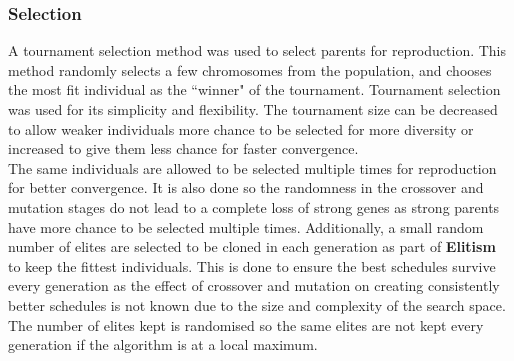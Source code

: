\documentclass{article}
\newcommand{\n}[0]{\\[\baselineskip]}
\begin{document}
\subsubsection{Selection}
A tournament selection method was used to select parents for reproduction. This method randomly selects a few chromosomes from the population, and chooses the most fit individual as the ``winner" of the tournament. Tournament selection was used for its simplicity and flexibility. The tournament size can be decreased to allow weaker individuals more chance to be selected for more diversity or increased to give them less chance for faster convergence. 
\n
The same individuals are allowed to be selected multiple times for reproduction for better convergence. It is also done so the randomness in the crossover and mutation stages do not lead to a complete loss of strong genes as strong parents have more chance to be selected multiple times. Additionally, a small random number of elites are selected to be cloned in each generation as part of \textbf{Elitism} to keep the fittest individuals. This is done to ensure the best schedules survive every generation as the effect of crossover and mutation on creating consistently better schedules is not known due to the size and complexity of the search space. The number of elites kept is randomised so the same elites are not kept every generation if the algorithm is at a local maximum.
\end{document}

